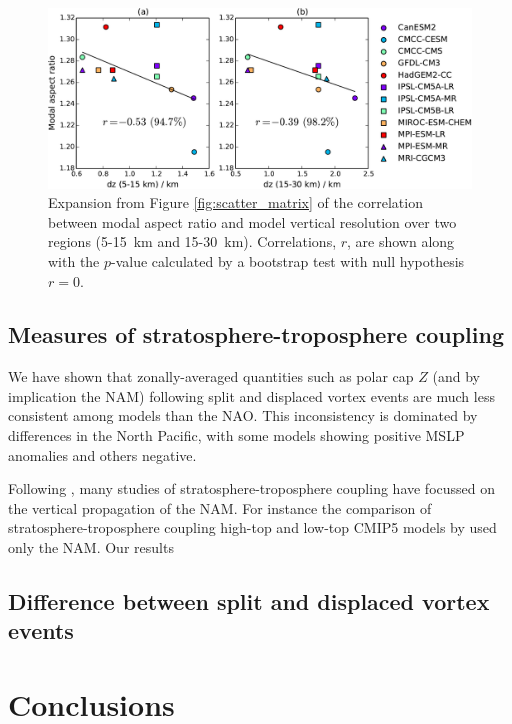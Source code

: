 \begin{figure}
 \centering
 \noindent\includegraphics[width=\textwidth]{figures/chapter-models/aspect_ratio_resolution.pdf}
 \caption[Vertical resolution and modal aspect ratio.]{Expansion from Figure
   \ref{fig:scatter_matrix} of the correlation between modal aspect ratio and
   model vertical resolution over two regions (5-15~km and
   15-30~km). Correlations, $r$, are shown along with the $p$-value calculated by a
   bootstrap test with null hypothesis $r=0$.}
 \label{fig:aspect_vert_res}
\end{figure}


\subsection{Measures of stratosphere-troposphere coupling}

We have shown that zonally-averaged quantities such as polar cap $Z$ (and by
implication the NAM) following split and displaced vortex events are much less
consistent among models than the NAO. This inconsistency is dominated by
differences in the North Pacific, with some models showing positive MSLP
anomalies and others negative.

Following \citet{Baldwin2001a}, many studies of stratosphere-troposphere
coupling have focussed on the vertical propagation of the NAM. For instance the
comparison of stratosphere-troposphere coupling high-top and low-top CMIP5
models by \citet{Charlton-Perez2013} used only the NAM. Our results 




\subsection{Difference between split and displaced vortex events}
\label{sec:cmip5_discuss_split_displ}







\section{Conclusions}



